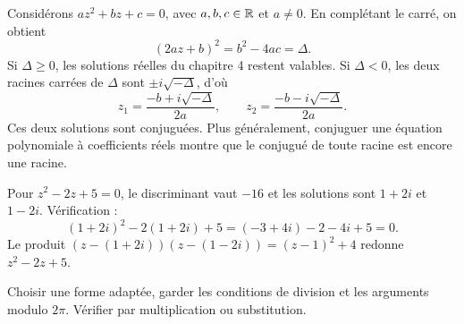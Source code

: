 Considérons $az^2+bz+c=0$, avec $a,b,c\in\mathbb{R}$ et $a\ne0$. En complétant le carré, on obtient
\[
(2az+b)^2=b^2-4ac=\Delta.
\]
Si $\Delta\ge0$, les solutions réelles du chapitre 4 restent valables. Si $\Delta<0$, les deux racines carrées de $\Delta$ sont $\pm i\sqrt{-\Delta}$, d'où
\[
z_1=\frac{-b+i\sqrt{-\Delta}}{2a},\qquad
z_2=\frac{-b-i\sqrt{-\Delta}}{2a}.
\]
Ces deux solutions sont conjuguées. Plus généralement, conjuguer une équation polynomiale à coefficients réels montre que le conjugué de toute racine est encore une racine.

\begin{examplebox}
Pour $z^2-2z+5=0$, le discriminant vaut $-16$ et les solutions sont $1+2i$ et $1-2i$. Vérification :
\[
(1+2i)^2-2(1+2i)+5=(-3+4i)-2-4i+5=0.
\]
Le produit $(z-(1+2i))(z-(1-2i))=(z-1)^2+4$ redonne $z^2-2z+5$.
\end{examplebox}

\begin{methodbox}
Choisir une forme adaptée, garder les conditions de division et les arguments modulo $2\pi$. Vérifier par multiplication ou substitution.
\end{methodbox}
